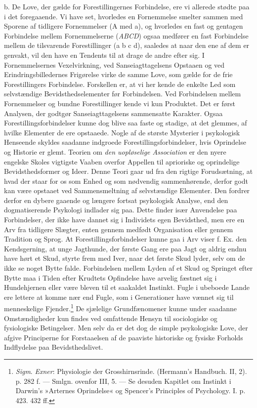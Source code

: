 \documentclass[12pt,a4paper,openany]{book}
\newcommand{\opage}[1]{\marginnote{\footnotesize\textit{[#1]}}}
\begin{document}
\opage{186}b. De Love, der gælde for Forestillingernes Forbindelse, ere
vi allerede stødte paa i det foregaaende. Vi have set, hvorledes en
Fornemmelse smelter sammen med Sporene af tidligere Fornemmelser (A med
a), og hvorledes en fast og gentagen Forbindelse mellem Fornemmelserne
(\emph{ABCD}) ogsaa medfører en fast Forbindelse mellem de tilsvarende
Forestillinger (a b c d), saaledes at naar den ene af dem er genvakt,
vil den have en Tendents til at drage de andre efter sig. I
Fornemmelsernes Vexelvirkning, ved Sanseiagttagelsens Opstaaen og ved
Erindringsbilledernes Frigørelse virke de samme Love, som gælde for de
frie Forestillingers Forbindelse. Forskellen er, at vi her kende de
enkelte Led som selvstændige Bevidsthedselementer før Forbindelsen. Ved
Forbindelsen mellem Fornemmelser og bundne Forestillinger kende vi kun
Produktet. Det er først Analysen, der godtgør Sanseiagttagelsens
sammensatte Karakter. Ogsaa Forestillingsforbindelser kunne dog blive
saa faste og stadige, at det glemmes, af hvilke Elementer de ere
opstaaede. Nogle af de største Mysterier i psykologisk Henseende skyldes
saadanne indgroede Forestillingsforbindelser, hvis Oprindelse og
Historie er glemt. Teorien om \emph{den uopløselige Association} er den
nyere engelske Skoles vigtigste Vaaben overfor Appellen til aprioriske
og oprindelige Bevidsthedsformer og Ideer. Denne Teori gaar ud fra den
rigtige Forudsætning, at hvad der staar for os som Enhed og som
nødvendig sammenhørende, derfor godt kan være opstaaet ved
Sammensmeltning af selvstændige Elementer. Den fordrer derfor en dybere
gaaende og længere fortsat psykologisk Analyse, end den dogmatiserende
Psykologi indlader sig paa. Dette finder især Anvendelse paa
Forbindelser, der ikke have dannet sig i Individets egen Bevidsthed, men
ere en Arv fra tidligere Slægter, enten gennem medfødt Organisation
eller gennem Tradition og Sprog. At Forestillingsforbindelser kunne gaa
i Arv viser f. Ex. den Kendsgerning, at unge Jagthunde, der første Gang
ere paa Jagt og aldrig endnu have hørt et Skud, styrte frem med Iver,
naar det første Skud lyder, selv om de ikke se noget Bytte falde.
Forbindelsen mellem Lyden af et Skud og Springet efter Bytte maa i Tiden
efter Krudtets Opfindelse have arvelig fæstnet sig i Hundehjernen eller
være bleven til et saakaldet Instinkt. Fugle i ubeboede Lande ere
\opage{187}lettere at komme nær end Fugle, som i Generationer have
vænnet sig til menneskelige Fjender.\footnote[1]{\emph{Sigm}.
\emph{Exner}: Physiologie der Grosshirnsrinde. (Hermann’s Handbuch. II,
2). p. 282 f. --- Smlgn. ovenfor III, 5. --- Se desuden Kapitlet om
Instinkt i Darwin’s »Arternes Oprindelse« og Spencer’s Principles of
Psychology. I. p. 423. 432 ff.} De sjælelige Grundfænomener kunne under
saadanne Omstændigheder kun findes ved omfattende Hensyn til
sociologiske og fysiologiske Betingelser. Men selv da er det dog de
simple psykologiske Love, der afgive Principerne for Forstaaelsen af de
paaviste historiske og fysiske Forholds Indflydelse paa
Bevidsthedslivet.
\end{document}

